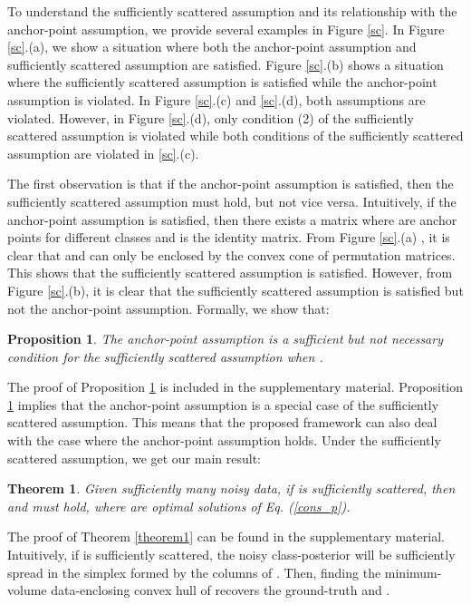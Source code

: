 \documentclass{article}
\newtheorem{theorem}{Theorem}
\newtheorem{proposition}{Proposition}
\begin{document}
To understand the sufficiently scattered assumption and its relationship with the anchor-point assumption, we provide several examples in Figure \ref{sc}.  In Figure \ref{sc}.(a), we show a situation where both the anchor-point assumption and sufficiently scattered assumption are satisfied. Figure \ref{sc}.(b) shows a situation where the sufficiently scattered assumption is satisfied while the anchor-point assumption is violated. In Figure \ref{sc}.(c) and \ref{sc}.(d), both assumptions are violated. However, in Figure \ref{sc}.(d), only condition (2) of the sufficiently scattered assumption is violated while both conditions of the sufficiently scattered assumption are violated in \ref{sc}.(c).

The first observation is that if the anchor-point assumption is satisfied, then the sufficiently scattered assumption must hold, but not vice versa. Intuitively, if the anchor-point assumption is satisfied, then there exists a matrix  where  are anchor points for different classes and  is the identity matrix. From Figure \ref{sc}.(a) , it is clear that  and  can only be enclosed by the convex cone of permutation matrices. This shows that the sufficiently scattered assumption is satisfied. However, from Figure \ref{sc}.(b), it is clear that the sufficiently scattered assumption is satisfied but not the anchor-point assumption.  Formally, we show that:

\begin{proposition}
	The anchor-point assumption is a sufficient but not necessary condition for the sufficiently scattered assumption when .
	\label{prop}
\end{proposition}





The proof of Proposition \ref{prop} is included in the supplementary
material. Proposition \ref{prop} implies that the anchor-point assumption is a special case of the sufficiently scattered assumption. This means that the proposed framework can also deal with the case where the anchor-point assumption holds. Under the sufficiently scattered assumption, we get our main result:
\begin{theorem}\label{t2}
Given sufficiently many noisy data, if  is sufficiently scattered, then  and  must hold, where  are optimal solutions of Eq. (\ref{cons_p}).
\label{theorem1}
\end{theorem} 

The proof of Theorem \ref{theorem1} can be found in the supplementary
material. Intuitively, if  is sufficiently scattered, the noisy class-posterior  will be sufficiently spread in the simplex formed by the columns of . 
Then, finding the minimum-volume data-enclosing convex hull of  recovers the ground-truth  and . 
\end{document}
